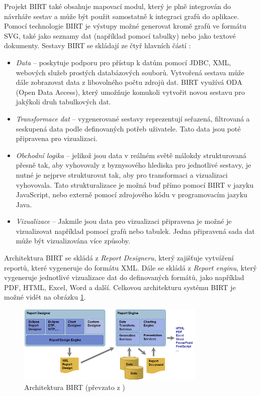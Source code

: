 \documentclass[czech,master,public,dept460,male,cpdeclaration,oneside]{diploma}
\begin{document}
Projekt BIRT také obsahuje mapovací modul, který je plně integrován do návrháře sestav a může být použit samostatně k integraci grafů do aplikace. Pomocí technologie BIRT je výstupy možné generovat kromě grafů ve formátu SVG, také jako seznamy dat (například pomocí tabulky) nebo jako textové dokumenty. Sestavy BIRT se skládají ze čtyř hlavních částí \cite{ref:birt_about}: 

\begin{itemize}
\item \textit{Data} -- poskytuje podporu pro přístup k datům pomocí JDBC, XML, webových služeb prostých databázových souborů. Vytvořená sestava může dále zobrazovat data z libovolného počtu zdrojů dat. BIRT využívá ODA (Open Data Access), který umožňuje komukoli vytvořit novou sestavu pro jakýkoli druh tabulkových dat.
\item \textit{Transformace dat} -- vygenerované sestavy reprezentují seřazená, filtrovaná a seskupená data podle definovaných potřeb uživatele. Tato data jsou poté připravena pro vizualizaci.
\item \textit{Obchodní logika} -- jelikož jsou data v reálném světě málokdy strukturovaná přesně tak, aby vyhovovaly z byznysového hlediska pro jednotlivé sestavy, je nutné je nejprve strukturovat tak, aby pro transformaci a vizualizaci vyhovovala. Tato strukturalizace je možná buď přímo pomocí BIRT v jazyku JavaScript, nebo externě pomocí zdrojového kódu v programovacím jazyku Java.

\item \textit{Vizualizace} -- Jakmile jsou data pro vizualizaci připravena je možné je vizualizovat například pomocí grafů nebo tabulek. Jedna připravená sada dat může být vizualizována více způsoby.
\end{itemize}

Architektura BIRT se skládá z \textit{Report Designeru}, který zajišťuje vytváření reportů, které vygeneruje do formátu XML. Dále se skládá z \textit{Report enginu}, který vygeneruje jednotlivé vizualizace dat do definovaných formátů, jako například PDF, HTML, Excel, Word a další. Celkovou architekturu systému BIRT je možné vidět na obrázku \ref{fig:birtarch}.

\begin{figure}[!ht]
    \centering
    \includegraphics[width=0.8\textwidth]{Diplomka/Figures/birtarch.png}
    \caption{Architektura BIRT (převzato z \cite{ref:birt_about})}
    \label{fig:birtarch}
\end{figure}
\end{document}
